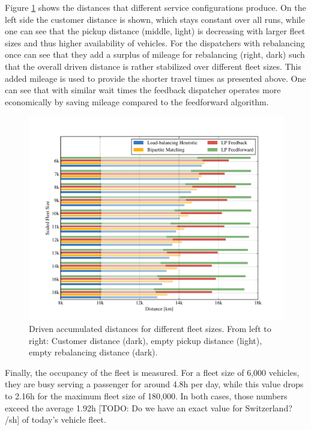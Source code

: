 
Figure \ref{fig:distances} shows the distances that different service configurations
produce. On the left side the customer distance is shown, which stays constant
over all runs, while one can see that the pickup distance (middle, light) is decreasing
with larger fleet sizes and thus higher availability of vehicles. For the dispatchers
with rebalancing once can see that they add a surplus of mileage for rebalancing (right, dark)
such that the overall driven distance is rather stabilized over different fleet sizes.
This added mileage is used to provide the shorter travel times as presented above.
One can see that with similar wait times the feedback dispatcher operates more economically
by saving mileage compared to the feedforward algorithm.

\begin{figure}
\includegraphics[width=1.0\textwidth]{figures/distances.pdf}
\caption{Driven accumulated distances for different fleet sizes. From left to right:
Customer distance (dark), empty pickup distance (light), empty rebalancing distance (dark).}
\label{fig:distances}
\end{figure}

Finally, the occupancy of the fleet is measured. For a fleet size of 6,000
vehicles, they are busy serving a passenger for around 4.8h per day, while
this value drops to 2.16h for the maximum fleet size of 180,000. In both cases,
those numbers exceed the average 1.92h [TODO: Do we have an exact value for Switzerland? /sh] of today's vehicle fleet.

